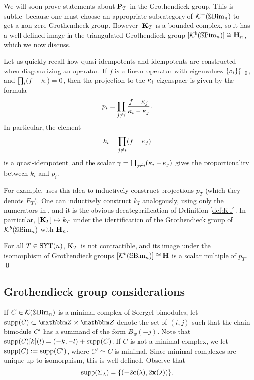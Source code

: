 We will soon prove statements about ${\mathbf P}_T$ in the Grothendieck group. This is subtle, because one must choose an appropriate subcategory of ${\mathcal{K}}^-({\mathbb{S}}{\rm Bim }_n)$ to get a non-zero Grothendieck group. However, ${\mathbf K}_T$ is a bounded complex, so it has a well-defined image in the triangulated Grothendieck group $[{\mathcal{K}}^b({\mathbb{S}}{\rm Bim }_n)] \cong {\mathbf H}_n$, which we now discuss.

Let us quickly recall how quasi-idempotents and idempotents are constructed when diagonalizing an operator. If $f$ is a linear operator with eigenvalues $\{\kappa_i\}_{i=0}^r$, and $\prod_i (f - \kappa_i) = 0$, then the projection to the $\kappa_i$ eigenspace is given by the formula
\begin{equation} p_i = \prod_{j \ne i} \frac{f - \kappa_j}{\kappa_i - \kappa_j}. \end{equation}
In particular, the element
\begin{equation} k_i = \prod_{j \ne i} (f - \kappa_j) \end{equation}
is a quasi-idempotent, and the scalar $\gamma = \prod_{j \ne i} (\kappa_i - \kappa_j)$ gives the proportionality between $k_i$ and $p_i$.

For example, \cite[Equation (11)]{IMO} uses this idea to inductively construct projections $p_T$ (which they denote $E_T$). One can inductively construct $k_T$ analogously, using only
the numerators in \cite[Equation (11)]{IMO}, and it is the obvious decategorification of Definition \ref{def:KT}. In particular, $[{\mathbf K}_T] \mapsto k_T$ under the identification of the
Grothendieck group of ${\mathcal{K}}^b({\mathbb{S}}{\rm Bim }_n)$ with ${\mathbf H}_n$.

\begin{cor} For all $T \in \operatorname{SYT}(n)$, ${\mathbf K}_T$ is not contractible, and its image under the isomorphism of Grothendieck groups $[{\mathcal{K}}^b({\mathbb{S}}{\rm Bim }_n)]\cong {\mathbf H}$ is a scalar multiple of $p_T$. \qed \end{cor}

\subsection{Grothendieck group considerations}
\label{subsec:groth}


If $C\in {\mathcal{K}}({\mathbb{S}}{\rm Bim }_n)$ is a minimal complex of Soergel bimodules, let $\supp(C)\subset \Z\times \Z$ denote the set of $(i,j)$ such that the chain bimodule $C^i$ has a summand of the form $B_w(-j)$.  Note that $\operatorname{supp}(C)[k](l) = (-k,-l)+\operatorname{supp}(C)$. If $C$ is not a minimal complex, we let $\operatorname{supp}(C):=\operatorname{supp}(C')$, where $C'\simeq C$ is minimal.  Since minimal complexes are unique up to isomorphism, this is well-defined.  Observe that
\[
\operatorname{supp}(\Sigma_\lambda)=\{(-2\mathbf{c}(\lambda),2\mathbf{x}(\lambda))\}.
\]

